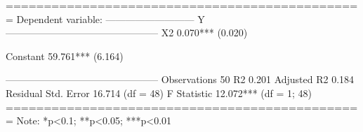 
===============================================
                        Dependent variable:    
                    ---------------------------
                                 Y             
-----------------------------------------------
X2                           0.070***          
                              (0.020)          
                                               
Constant                     59.761***         
                              (6.164)          
                                               
-----------------------------------------------
Observations                    50             
R2                             0.201           
Adjusted R2                    0.184           
Residual Std. Error      16.714 (df = 48)      
F Statistic           12.072*** (df = 1; 48)   
===============================================
Note:               *p<0.1; **p<0.05; ***p<0.01
